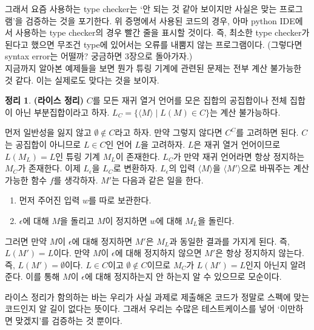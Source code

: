 \documentclass[b5paper, 10pt]{book}
\theoremstyle{definition}
\newtheorem{thm}[defn]{정리}
\newenvironment{pf*}{\pushQED{\qed}\pf}{\popQED\endpf}
\begin{document}
그래서 요즘 사용하는 type checker는 `안 되는 것 같아 보이지만 
사실은 맞는 프로그램'을 검증하는 것을 포기한다. 위 증명에서 
사용된 코드의 경우, 아마 python IDE에서 사용하는 type checker의 경우 빨간 줄을 표시할 것이다. 
즉, 최소한 type checker가 된다고 했으면 무조건 type에 있어서는 오류를 내뿜지 않는 프로그램이다. 
(그렇다면 syntax error는 어떨까? 궁금하면 3장으로 돌아가자.) \\ 
지금까지 알아본 예제들을 보면 뭔가 튜링 기계에 관련된 문제는 전부 계산 불가능한 것 같다.
이는 실제로도 맞다는 것을 보이자.
\begin{thm}
    \textbf{(라이스 정리)} $C$를 모든 재귀 열거 언어를 모은 집합의 공집합이나 
    전체 집합이 아닌 부분집합이라고 하자. $L_C = \{ \langle M \rangle \; \vert 
    \; L(M) \in C\}$는 계산 불가능하다. 
\end{thm}
\begin{pf*}
    먼저 일반성을 잃지 않고 $\emptyset \notin C$라고 하자. 만약 그렇지 않다면 $C^C$를 
    고려하면 된다.
    $C$는 공집합이 아니므로 $L\in C$인 언어 $L$을 고려하자. $L$은 재귀 열거 언어이므로
    $L(M_L) = L$인 튜링 기계 $M_L$이 존재한다. $L_C$가 만약 재귀 언어라면 항상 정지하는
    $M_C$가 존재한다. 이제 $L_\epsilon$을 $L_C$로 변환하자. $L_\epsilon$의 입력 
    $\langle M \rangle$을 $\langle M' \rangle$으로 바꿔주는 계산 가능한 함수 $f$를 생각하자.
    $M'$는 다음과 같은 일을 한다.
    \begin{enumerate}
        \item 먼저 주어진 입력 $w$를 따로 보관한다.
        \item $\epsilon$에 대해 $M$을 돌리고 $M$이 정지하면 $w$에 대해 $M_L$을 돌린다.
    \end{enumerate}
    그러면 만약 $M$이 $\epsilon$에 대해 정지하면 $M'$은 $M_L$과 동일한 결과를 가지게 된다.
    즉, $L(M') = L$이다. 만약 $M$이 $\epsilon$에 대해 정지하지 않으면 $M'$은 항상 정지하지 않는다.
    즉, $L(M') = \emptyset$이다. $L \in C$이고 $\emptyset \notin C$이므로 $M_C$가 $L(M') = L$인지
    아닌지 알려준다. 이를 통해 $M$이 $\epsilon$에 대해 정지하는지 안 하는지 알 수 있으므로 모순이다.
\end{pf*}
라이스 정리가 함의하는 바는 우리가 사실 과제로 제출해온 코드가 정말로 스펙에 맞는 코드인지
알 길이 없다는 뜻이다. 그래서 우리는 수많은 테스트케이스를 넣어 `이만하면 맞겠지'를 검증하는 것 뿐이다.
\end{document}
